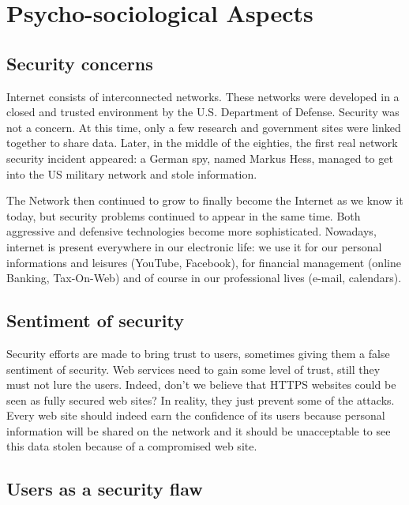 
\section{Psycho-sociological Aspects}

\subsection{Security concerns}

Internet consists of interconnected networks. These networks were developed in
a closed and trusted environment by the U.S. Department of Defense.
Security was not a concern. At this time, only a few research and government
sites were linked together to share data. Later, in the middle of the
eighties, the first real network security incident appeared: a German
spy, named Markus Hess, managed to get into the US military network and
stole information. 

The Network then continued to grow to finally become the Internet as we know
it today, but security problems continued to appear in the same time. Both
aggressive and defensive technologies become more sophisticated.
Nowadays, internet is present everywhere in our electronic life: we use it
for our personal informations and leisures (YouTube, Facebook), for financial
management (online Banking, Tax-On-Web) and of course in our professional
lives (e-mail, calendars).

\subsection{Sentiment of security}

Security efforts are made to bring trust to users, sometimes giving them a
false sentiment of security. Web services need to gain some level of trust, still they
must not lure the users. Indeed, don't we believe that HTTPS websites could be
seen as fully secured web sites? In reality, they just prevent some of the
attacks.
Every web site should indeed earn the confidence of its users because
personal information will be shared on the network and it should be
unacceptable to see this data stolen because of a compromised web site.

\subsection{Users as a security flaw}

